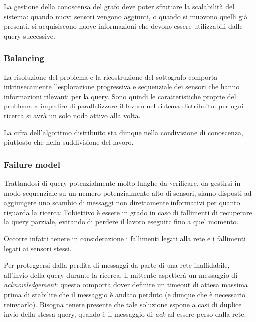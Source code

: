\documentclass{llncs}
\begin{document}
La gestione della conoscenza del grafo deve poter
sfruttare la scalabilità del sistema: quando nuovi sensori vengono
aggiunti, o quando si muovono quelli già presenti, si acquisiscono
nuove informazioni che devono essere utilizzabili dalle query successive.

\subsubsection*{Balancing}
La risoluzione del problema e la ricostruzione del sottografo
comporta intrinsecamente l'esplorazione progressiva e sequenziale
dei sensori che hanno informazioni rilevanti per la query.
Sono quindi le caratteristiche proprie del problema a impedire di
parallelizzare il lavoro nel sistema distribuito:
per ogni ricerca si avrà un solo nodo attivo alla volta.

La cifra dell'algoritmo distribuito sta dunque nella
condivisione di conoscenza, piuttosto che nella suddivisione del lavoro.

\subsubsection*{Failure model}
Trattandosi di query potenzialmente molto lunghe da verificare,
da gestirsi in modo sequenziale su un numero potenzialmente alto di sensori,
siamo disposti ad aggiungere uno scambio di messaggi non direttamente
informativi per quanto riguarda la ricerca: l'obiettivo è essere in grado
in caso di fallimenti di recuperare la query parziale,
evitando di perdere il lavoro eseguito fino a quel momento.

Occorre infatti tenere in considerazione i fallimenti legati alla rete e i
fallimenti legati ai sensori stessi.

Per proteggersi dalla perdita di messaggi da parte di una rete inaffidabile,
all'invio della query durante la ricerca, il mittente aspetterà un messaggio
di \emph{acknowledgement}: questo comporta dover definire un timeout
di attesa massima prima di stabilire che il messaggio è andato perduto
(e dunque che è necessario reinviarlo).
Bisogna tenere presente che
tale soluzione espone a casi di duplice invio della stessa query,
quando è il messaggio di \emph{ack} ad essere perso dalla rete.
\end{document}
